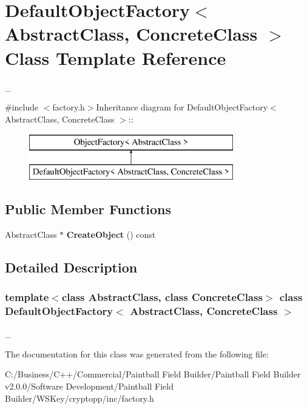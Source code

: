\hypertarget{class_default_object_factory}{
\section{DefaultObjectFactory$<$ AbstractClass, ConcreteClass $>$ Class Template Reference}
\label{class_default_object_factory}
}


\_\-  


{\ttfamily \#include $<$factory.h$>$}Inheritance diagram for DefaultObjectFactory$<$ AbstractClass, ConcreteClass $>$::\begin{figure}[H]
\begin{center}
\leavevmode
\includegraphics[height=2cm]{class_default_object_factory}
\end{center}
\end{figure}
\subsection*{Public Member Functions}
\begin{DoxyCompactItemize}
\item 
\hypertarget{class_default_object_factory_af54cac516aa6e1e0d55e5bc2061c6768}{
AbstractClass $\ast$ {\bfseries CreateObject} () const }
\label{class_default_object_factory_af54cac516aa6e1e0d55e5bc2061c6768}

\end{DoxyCompactItemize}


\subsection{Detailed Description}
\subsubsection*{template$<$class AbstractClass, class ConcreteClass$>$ class DefaultObjectFactory$<$ AbstractClass, ConcreteClass $>$}

\_\- 

The documentation for this class was generated from the following file:\begin{DoxyCompactItemize}
\item 
C:/Business/C++/Commercial/Paintball Field Builder/Paintball Field Builder v2.0.0/Software Development/Paintball Field Builder/WSKey/cryptopp/inc/factory.h\end{DoxyCompactItemize}
